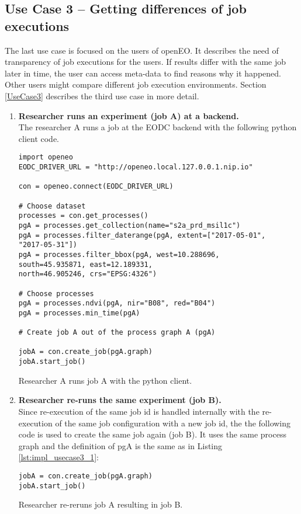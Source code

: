 \documentclass[draft,final]{vutinfth} %
\newenvironment{code}{\captionsetup{type=listing}}{}
\begin{document}
\subsection{Use Case 3 – Getting differences of job executions}\label{Implementation:Use Case3}
The last use case is focused on the users of openEO. It describes the need of transparency of job executions for the users. If results differ with the same job later in time, the user can access meta-data to find reasons why it happened. Other users might compare different job execution environments. Section \ref{UseCase3} describes the third use case in more detail.  
\begin{enumerate}
	\item \textbf{Researcher runs an experiment (job A) at a backend.}\\
	The researcher A runs a job at the EODC backend with the following python client code. 

\begin{code}
	\begin{verbatim}
import openeo
EODC_DRIVER_URL = "http://openeo.local.127.0.0.1.nip.io"

con = openeo.connect(EODC_DRIVER_URL)

# Choose dataset
processes = con.get_processes()
pgA = processes.get_collection(name="s2a_prd_msil1c")
pgA = processes.filter_daterange(pgA, extent=["2017-05-01", 
"2017-05-31"])
pgA = processes.filter_bbox(pgA, west=10.288696, 
south=45.935871, east=12.189331, 
north=46.905246, crs="EPSG:4326")

# Choose processes
pgA = processes.ndvi(pgA, nir="B08", red="B04")
pgA = processes.min_time(pgA)

# Create job A out of the process graph A (pgA)

jobA = con.create_job(pgA.graph)
jobA.start_job()
	\end{verbatim}
	\caption{Researcher A runs job A with the python client.}
	\label{lst:impl_usecase3_1}
\end{code}
	\item \textbf{Researcher re-runs the same experiment (job B).}\\
	Since re-execution of the same job id is handled internally with the re-execution of the same job configuration with a new job id, the the following code is used to create the same job again (job B). It uses the same process graph and the definition of pgA is the same as in Listing \ref{lst:impl_usecase3_1}:
\begin{code}
	\begin{verbatim}
jobA = con.create_job(pgA.graph)
jobA.start_job()
	\end{verbatim}
	\caption{Researcher re-reruns job A resulting in job B.}
	\label{lst:impl_usecase3_2}
\end{code}
	

\end{enumerate}
\end{document}
